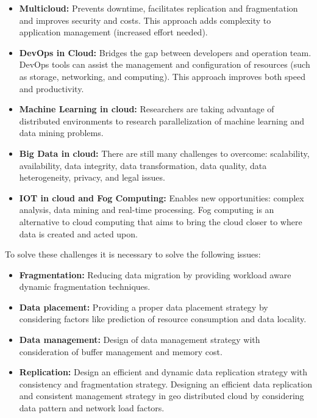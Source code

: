 \documentclass[14pt,oneside]{extreport}
\newcommand*\fpar{\hspace{1ex}}
\begin{document}
\begin{itemize}[noitemsep]

\item \textbf{Multicloud:} Prevents downtime, facilitates replication and fragmentation and improves security and costs. This approach adds complexity to application management (increased effort needed).

\item \textbf{DevOps in Cloud:} Bridges the gap between developers and operation team. DevOps tools can assist the management and configuration of resources (such as storage, networking, and computing). This approach improves both speed and productivity.

\item \textbf{Machine Learning in cloud:} Researchers are taking advantage of distributed environments to research parallelization of machine learning and data mining problems.

\item \textbf{Big Data in cloud:} There are still many challenges to overcome: scalability, availability, data integrity, data transformation, data quality, data heterogeneity, privacy, and legal issues.

\item \textbf{IOT in cloud and Fog Computing:} Enables new opportunities: complex analysis, data mining and real-time processing. Fog computing is an alternative to cloud computing that aims to bring the cloud closer to where data is created and acted upon.


\end{itemize}

\fpar To solve these challenges it is necessary to solve the following issues:
\begin{itemize}[noitemsep]
\item \textbf{Fragmentation:} Reducing data migration by providing workload aware dynamic fragmentation techniques.
\item \textbf{Data placement:} Providing a proper data placement strategy by considering factors like prediction of resource consumption and data locality.
\item \textbf{Data management:} Design of data management strategy with consideration of buffer management and memory cost.
\item \textbf{Replication:} Design an efficient and dynamic data replication strategy with consistency and fragmentation strategy. Designing an efficient data replication and consistent management strategy in geo distributed cloud by considering data pattern and network load factors.
\end{itemize}
\end{document}
